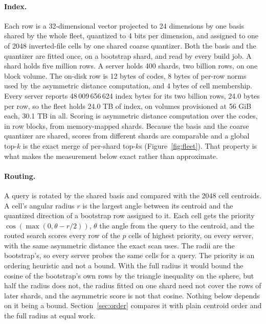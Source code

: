 \documentclass[sigconf, nonacm]{acmart}
\begin{document}
\paragraph{Index.} Each row is a 32-dimensional vector projected to 24 dimensions by one basis
shared by the whole fleet, quantized to 4 bits per dimension, and assigned to one of 2048
inverted-file cells by one shared coarse quantizer. Both the basis and the quantizer are fitted
once, on a bootstrap shard, and read by every build job. A shard holds five million rows. A server
holds 400 shards, two billion rows, on one block volume. The on-disk row is 12 bytes of codes, 8
bytes of per-row norms used by the asymmetric distance computation, and 4 bytes of cell membership.
Every server reports 48\,009\,656\,624 index bytes for its two billion rows, 24.0 bytes per row,
so the fleet holds 24.0 TB of index, on volumes provisioned at 56 GiB each, 30.1 TB in all.
Scoring is asymmetric distance computation over the codes, in row blocks, from memory-mapped
shards. Because the basis and the coarse quantizer are shared, scores from different shards are
comparable and a global top-$k$ is the exact merge of per-shard top-$k$s (Figure~\ref{fig:fleet}).
That property is what makes the measurement below exact rather than approximate.

\paragraph{Routing.} A query is rotated by the shared basis and compared with the 2048 cell
centroids. A cell's angular radius $r$ is the largest angle between its centroid and the quantized
direction of a bootstrap row assigned to it. Each cell gets the priority $\cos(\max(0, \theta -
r/2))$, $\theta$ the angle from the query to the centroid, and the routed search scores every row of
the $p$ cells of highest priority, on every server, with the same asymmetric distance the exact scan
uses. The radii are the bootstrap's, so every server probes the same cells for a query. The
priority is an ordering heuristic and not a bound. With the full radius it would bound the cosine
of the bootstrap's own rows by the triangle inequality on the sphere, but half the radius does not,
the radius fitted on one shard need not cover the rows of later shards, and the asymmetric score is
not that cosine. Nothing below depends on it being a bound. Section~\ref{sec:order} compares it
with plain centroid order and the full radius at equal work.
\end{document}
